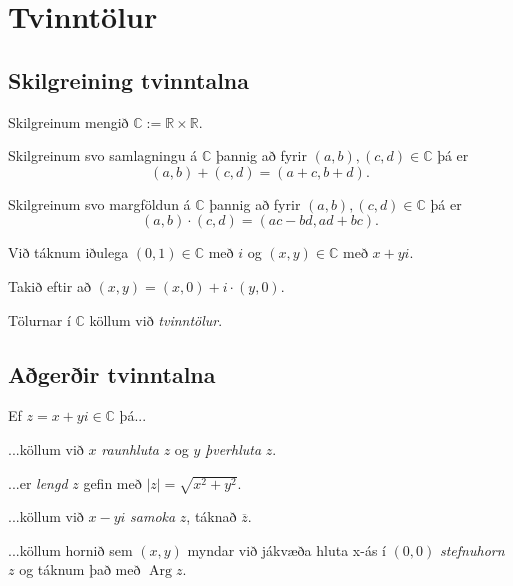 \section{Tvinntölur}
\subsection{Skilgreining tvinntalna}
{
    {
        \item<1-> Skilgreinum mengið $\mathbb{C} := \mathbb{R} \times \mathbb{R}$.
        \item<2-> Skilgreinum svo samlagningu á $\mathbb{C}$ þannig að fyrir $(a, b), (c, d) \in \mathbb{C}$ þá er
        \[
            (a, b) + (c, d) = (a + c, b + d).
        \]
        \item<3-> Skilgreinum svo margföldun á $\mathbb{C}$ þannig að fyrir $(a, b), (c, d) \in \mathbb{C}$ þá er
        \[
            (a, b) \cdot (c, d) = (ac - bd, ad + bc).
        \]
        \item<4-> Við táknum iðulega $(0, 1) \in \mathbb{C}$ með $i$ og $(x, y) \in \mathbb{C}$ með $x + yi$.
        \item<5-> Takið eftir að $(x, y) = (x, 0) + i \cdot (y, 0)$.
        \item<6-> Tölurnar í $\mathbb{C}$ köllum við \emph{tvinntölur}.
    }
}

\subsection{Aðgerðir tvinntalna}
{
    {
        \item<1-> Ef $z = x + yi \in \mathbb{C}$ þá...
        {
            \item<2-> ...köllum við $x$ \emph{raunhluta} $z$ og $y$ \emph{þverhluta} $z$.
            \item<3-> ...er \emph{lengd} $z$ gefin með $|z| = \sqrt{x^2 + y^2}$.
            \item<4-> ...köllum við $x - yi$ \emph{samoka} $z$, táknað $\overline{z}$.
            \item<5-> ...köllum hornið sem $(x, y)$ myndar við jákvæða hluta x-ás í $(0, 0)$ \emph{stefnuhorn} $z$
                        og táknum það með $\operatorname{Arg} z$.
        }
    }
}

